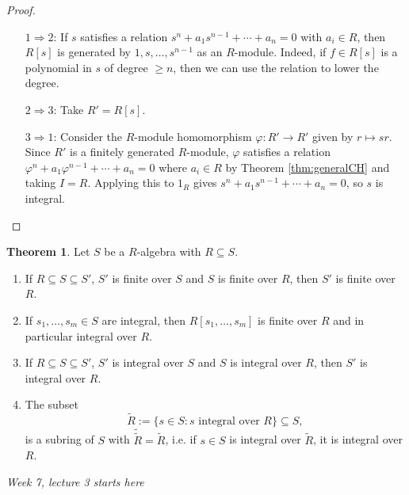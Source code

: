 \documentclass[a4paper]{article}
\theoremstyle{definition}
\newtheorem{thm}[defn]{Theorem}
\begin{document}
\begin{proof} \

\begin{enumerate}
\item[$1\Rightarrow 2$:] If $s$ satisfies a relation $s^n+a_1s^{n-1}+\cdots+a_n=0$ with $a_i\in R$, then $R[s]$ is generated by $1,s,\ldots,s^{n-1}$ as an $R$-module. Indeed, if $f\in R[s]$ is a polynomial in $s$ of degree $\geq n$, then we can use the relation to lower the degree.
\item[$2\Rightarrow 3$:] Take $R'=R[s]$.
\item[$3\Rightarrow 1$:] Consider the $R$-module homomorphism $\varphi:R'\rightarrow R'$ given by $r\mapsto sr$. Since $R'$ is a finitely generated $R$-module, $\varphi$ satisfies a relation $\varphi^n+a_1\varphi^{n-1}+\cdots+a_n=0$ where $a_i\in R$ by Theorem \ref{thm:generalCH} and taking $I=R$. Applying this to $1_R$ gives $s^n+a_1s^{n-1}+\cdots+a_n=0$, so $s$ is integral.
\end{enumerate}
\end{proof}

\begin{thm}
\label{thm:integral}
Let $S$ be a $R$-algebra with $R\subseteq S$.
\begin{enumerate}
\item If $R\subseteq S\subseteq S'$, $S'$ is finite over $S$ and $S$ is finite over $R$, then $S'$ is finite over $R$.
\item If $s_1,\ldots,s_m\in S$ are integral, then $R[s_1,\ldots,s_m]$ is finite over $R$ and in particular integral over $R$.
\item If $R\subseteq S\subseteq S'$, $S'$ is integral over $S$ and $S$ is integral over $R$, then $S'$ is integral over $R$.
\item The subset
\[
\widetilde R:=\{s\in S:s\text{ integral over }R\}\subseteq S,
\]
is a subring of $S$ with $\widetilde{\widetilde R}=\widetilde R$, i.e. if $s\in S$ is integral over $\widetilde R$, it is integral over $R$.
\end{enumerate}
\end{thm}

\begin{flushright}
\textit{Week 7, lecture 3 starts here}
\end{flushright}
\end{document}
